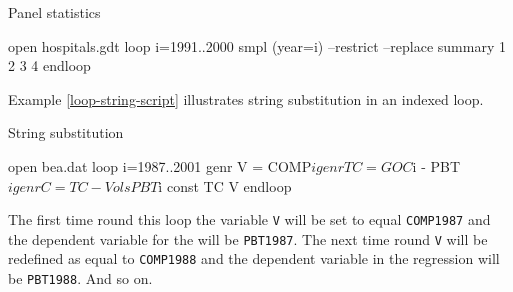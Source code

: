\begin{script}[htbp]
  \caption{Panel statistics}
  \label{loop-panel-script}
\begin{scode}
open hospitals.gdt
loop i=1991..2000
  smpl (year=i) --restrict --replace
  summary 1 2 3 4
endloop
\end{scode}
\end{script}


Example \ref{loop-string-script} illustrates string substitution in an
indexed loop.

\begin{script}[htbp]
  \caption{String substitution}
  \label{loop-string-script}
\begin{scode}
open bea.dat
loop i=1987..2001
  genr V = COMP$i
  genr TC = GOC$i - PBT$i
  genr C = TC - V
  ols PBT$i const TC V
endloop
\end{scode}
\end{script}

The first time round this loop the variable \verb+V+ will be set to
equal \verb+COMP1987+ and the dependent variable for the 
will be \verb+PBT1987+. The next time round \verb+V+ will be redefined
as equal to \verb+COMP1988+ and the dependent variable in the
regression will be \verb+PBT1988+.  And so on.


